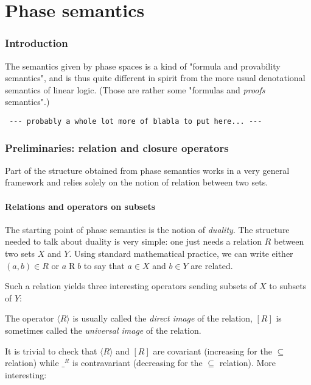 \chapter{Phase semantics}\label{phase-semantics}

\subsection{Introduction}\label{introduction}

The semantics given by phase spaces is a kind of "formula and
provability semantics", and is thus quite different in spirit from the
more usual denotational semantics of linear logic. (Those are rather
some "formulas and \emph{proofs} semantics".)

\texttt{~-\/-\/-~probably~a~whole~lot~more~of~blabla~to~put~here...~-\/-\/-}

\subsection{Preliminaries: relation and closure
operators}\label{preliminaries-relation-and-closure-operators}

Part of the structure obtained from phase semantics works in a very
general framework and relies solely on the notion of relation between
two sets.

\subsubsection{Relations and operators on
subsets}\label{relations-and-operators-on-subsets}

The starting point of phase semantics is the notion of \emph{duality}.
The structure needed to talk about duality is very simple: one just
needs a relation \(R\) between two sets \(X\) and \(Y\). Using standard
mathematical practice, we can write either \((a,b) \in R\) or
\(a\mathrel{R} b\) to say that \(a\in X\) and \(b\in Y\) are related.

Such a relation yields three interesting operators sending subsets of
\(X\) to subsets of \(Y\):

The operator \(\langle R\rangle\) is usually called the \emph{direct
image} of the relation, \([R]\) is sometimes called the \emph{universal
image} of the relation.

It is trivial to check that \(\langle R\rangle\) and \([R]\) are
covariant (increasing for the \(\subseteq\) relation) while \(\_^R\) is
contravariant (decreasing for the \(\subseteq\) relation). More
interesting:

